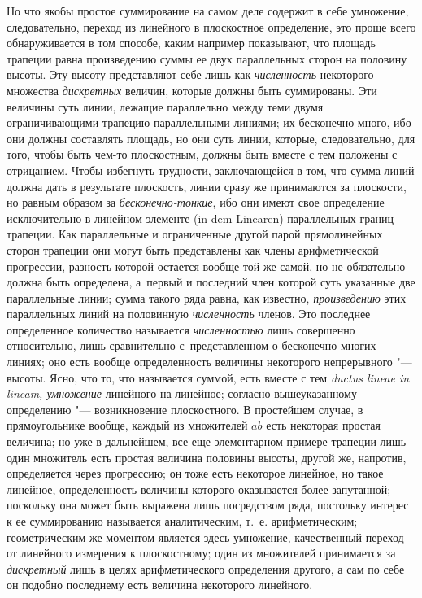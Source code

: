 Но что якобы простое суммирование на самом деле содержит в себе умножение,
следовательно, переход из линейного в плоскостное определение, это проще всего
обнаруживается в том способе, каким например показывают, что площадь трапеции
равна произведению суммы ее двух параллельных сторон на половину высоты. Эту
высоту представляют себе лишь как {\em численность} некоторого множества
{\em дискретных} величин, которые должны быть суммированы. Эти величины суть
линии, лежащие параллельно между теми двумя ограничивающими трапецию
параллельными линиями; их бесконечно много, ибо они должны составлять площадь,
но они суть линии, которые, следовательно, для того, чтобы быть чем-то
плоскостным, должны быть вместе с тем положены с отрицанием. Чтобы избегнуть
трудности, заключающейся в том, что сумма линий должна дать в результате
плоскость, линии сразу же принимаются за плоскости, но равным образом за
{\em бесконечно-тонкие}, ибо они имеют свое определение исключительно в
линейном элементе (in dem Li\-nea\-ren) параллельных границ трапеции. Как
параллельные и ограниченные другой парой прямолинейных сторон трапеции они
могут быть представлены как члены арифметической прогрессии, разность которой
остается вообще той же самой, но не обязательно должна быть определена,
а~первый и последний член которой суть указанные две параллельные линии; сумма
такого ряда равна, как известно, {\em произведению} этих параллельных линий на
половинную {\em численность} членов. Это последнее определенное количество
называется {\em численностью} лишь совершенно относительно, лишь сравнительно
с~представленном о бесконечно-многих линиях; оно есть вообще определенность
величины некоторого {непрерывного} "--- высоты. Ясно, что то, что называется
суммой, есть вместе с тем {\em ductus lineae in lineam, умножение}
линейного на линейное; согласно вышеуказанному определению "--- возникновение
плоскостного. В простейшем случае, в прямоугольнике вообще, каждый из
множителей $ab$ есть некоторая простая величина; но уже в дальнейшем, все еще
элементарном примере трапеции лишь один множитель есть простая величина
половины высоты, другой же, напротив, определяется через прогрессию; он тоже
есть некоторое линейное, но такое линейное, определенность величины которого
оказывается более запутанной; поскольку она может быть выражена лишь
посредством ряда, постольку интерес к ее суммированию называется аналитическим,
т.~е. арифметическим; геометрическим же моментом является здесь умножение,
качественный переход от линейного измерения к плоскостному; один из
множителей принимается за {\em дискретный} лишь в целях
арифметического определения другого, а сам по себе он
подобно последнему есть величина некоторого линейного.

